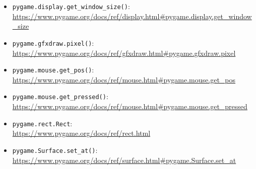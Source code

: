 \begin{itemize}
	\item \texttt{pygame.display.get\_window\_size()}:
	\\
	\url{https://www.pygame.org/docs/ref/display.html#pygame.display.get_window_size}

	\item \texttt{pygame.gfxdraw.pixel()}:
    \\ \url{https://www.pygame.org/docs/ref/gfxdraw.html#pygame.gfxdraw.pixel}

	\item \texttt{pygame.mouse.get\_pos()}:
	\\
	\url{https://www.pygame.org/docs/ref/mouse.html#pygame.mouse.get_pos}

	\item \texttt{pygame.mouse.get\_pressed()}:
	\\
	\url{https://www.pygame.org/docs/ref/mouse.html#pygame.mouse.get_pressed}

	\item \texttt{pygame.rect.Rect}:
    \\
    \url{https://www.pygame.org/docs/ref/rect.html}
	
	\item \texttt{pygame.Surface.set\_at()}:
	\\
	\url{https://www.pygame.org/docs/ref/surface.html#pygame.Surface.set_at}
	
\end{itemize}

